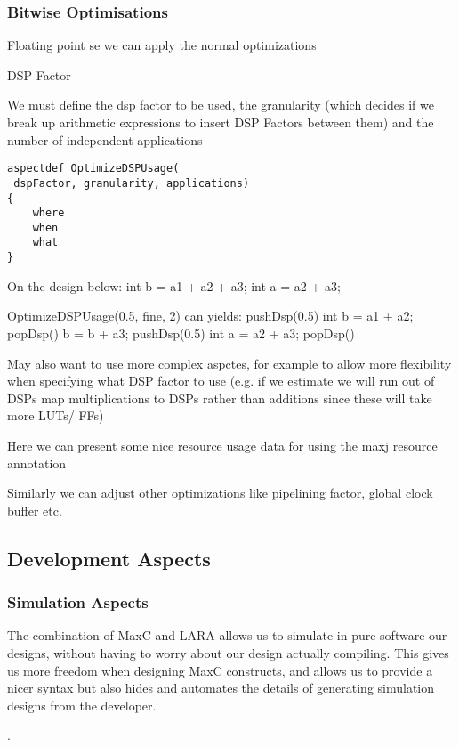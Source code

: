 \subsubsection{Bitwise Optimisations}

Floating point se we can apply the normal optimizations

DSP Factor

We must define the dsp factor to be used, the granularity (which
decides if we break up arithmetic expressions to insert DSP Factors
between them) and the number of independent applications

\lstset{style=aspectp}
\begin{lstlisting}
aspectdef OptimizeDSPUsage(
 dspFactor, granularity, applications)
{
    where
    when
    what
}
\end{lstlisting}

On the design below:
int b = a1 + a2 + a3;
int a = a2 + a3;

OptimizeDSPUsage(0.5, fine, 2) can yields:
pushDsp(0.5)
int b = a1 + a2;
popDsp()
b = b + a3;
pushDsp(0.5)
int a = a2 + a3;
popDsp()

May also want to use more complex aspctes, for example to
allow more flexibility when specifying what DSP factor to use
(e.g. if we estimate we will run out of DSPs map
multiplications to DSPs rather than additions since these will
take more LUTs/ FFs)

Here we can present some nice resource usage data for using the maxj resource annotation



Similarly we can adjust other optimizations like pipelining factor, global clock buffer etc.


\subsection{Development Aspects}

\subsubsection{Simulation Aspects}
The combination of MaxC and LARA allows us to simulate in pure
software our designs, without having to worry about our design
actually compiling. This gives us more freedom when designing MaxC
constructs, and allows us to provide a nicer syntax but also hides and
automates the details of generating simulation designs from the
developer.

.


